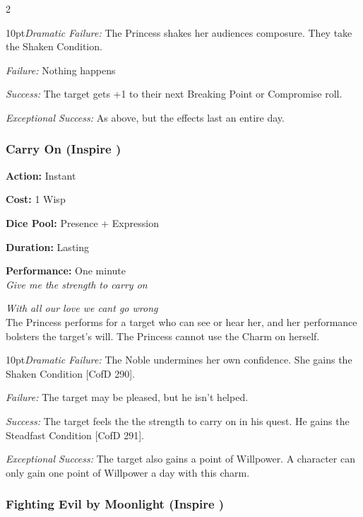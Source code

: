 \begin{multicols}{2}
\begin{myindentpar}{10pt}\emph{Dramatic Failure:} The Princess shakes her audiences composure. They take the Shaken Condition. 
 
 \emph{Failure:} Nothing happens
 
 \emph{Success:} The target gets +1 to their next Breaking Point or Compromise roll.
 
 \emph{Exceptional Success:} As above, but the effects last an entire day.
 
 \end{myindentpar}


\subsubsection*{Carry On (Inspire \textbullet\textbullet)}

\noindent \textbf{Action:} Instant

\noindent \textbf{Cost:} 1 Wisp

\noindent \textbf{Dice Pool:} Presence + Expression 

\noindent \textbf{Duration:} Lasting

\noindent \textbf{Performance:} One minute\\

\textit{Give me the strength to carry on}

\textit{With all our love we cant go wrong}\\

\noindent The Princess performs for a target who can see or hear her, and her performance bolsters the target's will. The Princess cannot use the Charm on herself.

\begin{myindentpar}{10pt}\emph{Dramatic Failure:} The Noble undermines her own confidence. She gains the Shaken Condition [CofD 290].
 
 \emph{Failure:}  The target may be pleased, but he isn’t helped.
 
 \emph{Success:} The target feels the the strength to carry on in his quest. He gains the Steadfast Condition [CofD 291].

 \emph{Exceptional Success:} The target also gains a point of Willpower. A character can only gain one point of Willpower a day with this charm. 
 
\end{myindentpar}

\subsubsection*{Fighting Evil by Moonlight (Inspire \textbullet\textbullet)}


\end{multicols}
